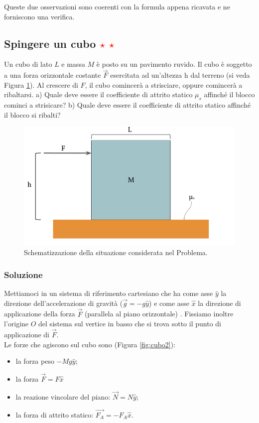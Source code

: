 \documentclass[12pt,a4paper]{book}
\newcommand{\rstar}{ \textcolor{red}{$\star$}}
\begin{document}
Queste due osservazioni sono coerenti con la formula appena ricavata e ne forniscono una verifica. 

\subsection{Spingere un cubo \rstar \rstar}
Un cubo di lato $L$ e massa $M$ è posto su un pavimento ruvido. Il cubo è soggetto a una forza 
orizzontale costante $\vec{F}$ esercitata ad un'altezza h dal terreno (si veda Figura \ref{fig:cubo1}). Al crescere di $F$, il cubo comincerà a strisciare, oppure comincerà a ribaltarsi. 
a) Quale deve essere il coefficiente di attrito statico $\mu_s$
affinché il blocco cominci a strisicare? b) Quale deve essere il coefficiente di attrito statico affinché il blocco si ribalti? 

\begin{figure}[!ht]
 \centering
\includegraphics[scale=0.45]{cubo1.pdf}
\caption{Schematizzazione della situazione considerata nel Problema. \label{fig:cubo1} }
\end{figure}

\subsubsection*{Soluzione}
Mettiamoci in un sistema di riferimento cartesiano che ha come asse $\hat{y}$ la direzione dell'accelerazione di gravità ($\vec{g}=-g\hat{y}$) e come asse $\hat{x}$ la direzione di applicazione della forza $\vec{F}$ (parallela al piano orizzontale) . Fissiamo inoltre l'origine $O$ del sistema sul vertice in basso che si trova sotto il punto di applicazione di $\vec{F}$. \\

Le forze che agiscono sul cubo sono (Figura \ref{fig:cubo2}):
\begin{itemize}
\item la forza peso $-Mg\hat{y}$;
\item la forza $\vec{F}=F\hat{x}$
\item la reazione vincolare del piano: $\vec{N}=N\hat{y}$;
\item la forza di attrito statico:  $\vec{F_A}=-F_A\hat{x}$.
\end{itemize}
\end{document}
